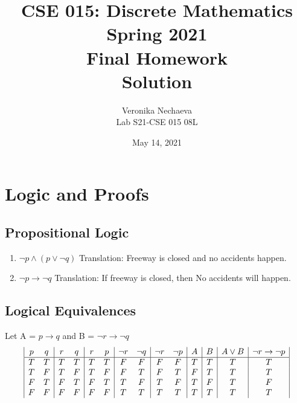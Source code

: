 \documentclass[11pt]{article}
\begin{document}
\author{Veronika Nechaeva\\
Lab S21-CSE 015 08L}

\title{CSE 015: Discrete Mathematics\\
Spring 2021\\
Final Homework\\
Solution}

\date{May 14, 2021}
\maketitle

\section{Logic and Proofs}

\subsection{Propositional Logic}

\begin{enumerate}[label=(\alph*)]

\item 
$\neg p\land (p\lor\neg q)$ Translation: Freeway is closed and no accidents happen.

\item 
$\neg p\rightarrow\neg q$ Translation: If freeway is closed, then No accidents will happen.

\end{enumerate}


\subsection{Logical Equivalences}


Let A = $p\rightarrow q$ and B = $\neg r \rightarrow \neg q$
\begin{displaymath}
\begin{array}{|c c|c c|c c|c c|c c|c|c|c|c|}
p & q & r & q & r & p & \neg r & \neg q & \neg r & \neg p & A & B & A \lor B & \neg r \rightarrow \neg p\\
\hline
T & T & T & T & T & T & F & F & F & F & T & T & T & T\\
T & F & T & F & T & F & F & T & F & T & F & T & T & T\\
F & T & F & T & F & T & T & F & T & F & T & F & T & F\\
F & F & F & F & F & F & T & T & T & T & T & T & T & T\\
\end{array}
\end{displaymath}
\end{document}
